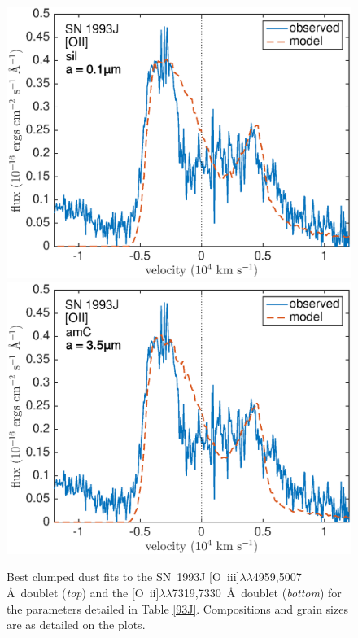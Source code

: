 \begin{figure}
\includegraphics[scale=0.4,clip=true, trim=0 0 40 20]{chapters/chapter6/figs/93J/clumped/OII_sil}
\includegraphics[scale=0.4,clip=true, trim=30 0 40 20]{chapters/chapter6/figs/93J/clumped/OII_amC}
\caption{Best clumped dust fits to the SN~1993J [O~{\sc iii}]$\lambda\lambda$4959,5007 \AA\ doublet ({\em top}) and the [O~{\sc ii}]$\lambda\lambda$7319,7330~\AA\ doublet  ({\em bottom}) for the parameters detailed in Table \ref{93J}.  Compositions and grain sizes are as detailed on the plots.}
\label{93J_clumped}
\end{figure}

